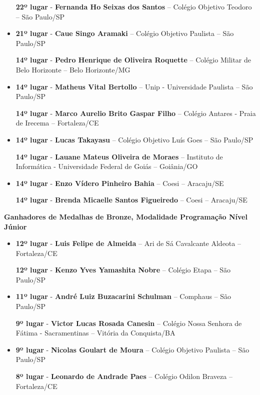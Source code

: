 \documentclass{article}
\begin{document}
\begin{itemize}
\textbf{22º lugar} - \textbf{Fernanda Ho Seixas dos Santos} – Colégio Objetivo Teodoro – São Paulo/SP



\item
\textbf{21º lugar} - \textbf{Caue Singo Aramaki} – Colégio Objetivo Paulista – São Paulo/SP


\textbf{14º lugar} - \textbf{Pedro Henrique de Oliveira Roquette} – Colégio Militar de Belo Horizonte – Belo Horizonte/MG



\item
\textbf{14º lugar} - \textbf{Matheus Vital Bertollo} – Unip - Universidade Paulista – São Paulo/SP


\textbf{14º lugar} - \textbf{Marco Aurelio Brito Gaspar Filho} – Colégio Antares - Praia de Irecema – Fortaleza/CE



\item
\textbf{14º lugar} - \textbf{Lucas Takayasu} – Colégio Objetivo Luís Goes – São Paulo/SP


\textbf{14º lugar} - \textbf{Lauane Mateus Oliveira de Moraes} – Instituto de Informática - Universidade Federal de Goiás – Goiânia/GO



\item
\textbf{14º lugar} - \textbf{Enzo Vídero Pinheiro Bahia} – Coesi – Aracaju/SE


\textbf{14º lugar} - \textbf{Brenda Micaelle Santos Figueiredo} – Coesi – Aracaju/SE



\end{itemize}

\textbf{\color{blue}Ganhadores de Medalhas de Bronze, \color{black}Modalidade Programação Nível Júnior}
\color{black}

\begin{itemize}
\item
\textbf{12º lugar} - \textbf{Luis Felipe de Almeida} – Ari de Sá Cavalcante Aldeota – Fortaleza/CE


\textbf{12º lugar} - \textbf{Kenzo Yves Yamashita Nobre} – Colégio Etapa – São Paulo/SP



\item
\textbf{11º lugar} - \textbf{André Luiz Buzacarini Schulman} – Comphaus – São Paulo/SP


\textbf{9º lugar} - \textbf{Victor Lucas Rosada Canesin} – Colégio Nossa Senhora de Fátima - Sacramentinas – Vitória da Conquista/BA



\item
\textbf{9º lugar} - \textbf{Nicolas Goulart de Moura} – Colégio Objetivo Paulista – São Paulo/SP


\textbf{8º lugar} - \textbf{Leonardo de Andrade Paes} – Colégio Odilon Braveza – Fortaleza/CE



\end{itemize}
\end{document}
